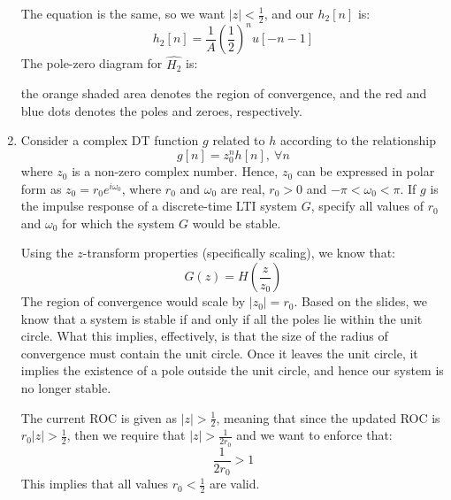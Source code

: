 \documentclass[10pt]{article}
\begin{document}
\begin{enumerate}[label=\alph*)]
			\begin{solution}
				The equation is the same, so we want \( |z| < \frac{1}{2} \), and our \( h_2[n] \) is:
				\[
					h_2[n] = \frac{1}{A}\left( \frac{1}{2} \right)^{n}u[-n - 1]
				\] 
				The pole-zero diagram for \( \hat{H_2} \) is:
				\begin{center}
				\end{center}
				the orange shaded area denotes the region of convergence, and the red and blue dots denotes 
				the poles and zeroes, respectively.
		\end{solution}
		\item Consider a complex DT function \( g \) related to \( h \) according to the relationship
			\[
				g[n] = z_0^{n}h[n], \ \forall n
			\] 
			where \( z_0 \) is a non-zero complex number. Hence, \( z_0 \) can be expressed in polar form 
			as \( z_0 = r_0e^{i \omega_0} \), where \( r_0 \) and \( \omega_0 \) are real, \( r_0 > 0 \) 
			and \( -\pi < \omega_0 < \pi \). If \( g \) is the impulse response of a discrete-time LTI system \( G \), 
			specify all values of \( r_0 \) and \( \omega_0 \) for which the system \( G \) would be stable. 

			\begin{solution}
				Using the \( z \)-transform properties (specifically scaling), we know that:
				\[
				G(z) = H(\frac{z}{z_0})
				\] 
				The region of convergence would scale by \( |z_0| = r_0 \). Based on the slides, we know that 
				a system is stable if and only if all the poles lie within the unit circle. What this implies, 
				effectively, is that the size of the radius of convergence must contain the unit circle. Once it leaves 
				the unit circle, it implies the existence of a pole outside the unit circle, and hence our system is 
				no longer stable. 

				The current ROC is given as \( |z| > \frac{1}{2} \), meaning that since the updated ROC is 
				\( r_0|z| > \frac{1}{2} \), then we require that \( |z| > \frac{1}{2r_0} \) and we want to 
				enforce that:
				\[
				\frac{1}{2r_0} > 1
				\] 
				This implies that all values \( r_0 < \frac{1}{2} \) are valid. 
			\end{solution}
	\end{enumerate}
\end{document}
